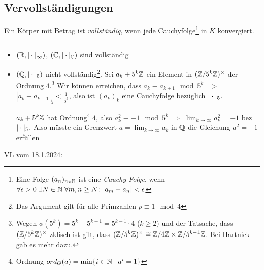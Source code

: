 \documentclass[../main.tex]{subfiles}
\begin{document}
\subsection{Vervollständigungen}
\begin{definition}
    Ein Körper mit Betrag ist \emph{vollständig}, wenn jede Cauchyfolge\footnote{Eine Folge $(a_n)_{n\in\mathbb{N}}$ ist eine \emph{Cauchy-Folge}, wenn $\forall\epsilon>0\;\exists N\in \mathbb{N}\;\forall m,n\geq N\colon |a_m - a_n| <\epsilon$} in $K$ konvergiert.
\end{definition}
\begin{example} \label{theo:4.18}$ $
    \begin{itemize}
        \item $(\mathbb{R},|\cdot|_\infty)$, $(\mathbb{C}, |\cdot|_{\mathbb{C}})$ sind vollständig
        \item $(\mathbb{Q}, |\cdot|_5)$ nicht vollständig\footnote{Das Argument gilt für alle Primzahlen $p\equiv 1\mod 4$}.
        Sei $a_k + 5^k\mathbb{Z}$ ein Element in $(\mathbb{Z}/5^k\mathbb{Z})^\times$ der Ordnung $4$.\footnote{Wegen $\phi(5^k) = 5^k-5^{k-1}  = 5^{k-1} \cdot 4$ ($k\geq 2$) und der Tatsache, dass $(\mathbb{Z}/5^k\mathbb{Z})^\times$ zklisch ist gilt, dass $(\mathbb{Z}/5^k\mathbb{Z})^\times \cong \mathbb{Z}/4\mathbb{Z} \times \mathbb{Z}/5^{k-1}\mathbb{Z}$. Bei Hartnick gab es mehr dazu.}
        Wir können erreichen, dass $a_k\equiv a_{k+1}\mod 5^k$
        => $|a_k-a_{k+1}|_5 < \frac{1}{5^k}$, also ist $(a_k)_k$ eine Cauchyfolge bezüglich $|\cdot|_5$.

        $a_k + 5^k\mathbb{Z}$ hat Ordnung\footnote{Ordnung $ord_G(a) = \min\{i\in\mathbb{N}\mid a^i = 1\}$} $4$, also $a_k^2 \equiv -1 \mod 5^k$ $\Longrightarrow$ $\lim_{k\rightarrow \infty} a_k^2 = -1$ bez $|\cdot|_5$.
        Also müsste ein Grenzwert $a=\lim_{k\rightarrow \infty} a_k$ in $\mathbb{Q}$ die Gleichung $a^2= -1$ erfüllen \Lightning
    \end{itemize}
\end{example}

\begin{flushright}
VL vom 18.1.2024:
\end{flushright}
\end{document}
